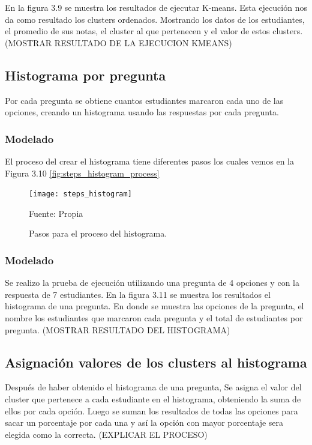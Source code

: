 En la figura 3.9 se muestra los resultados de ejecutar K-means. Esta ejecución nos da como resultado los clusters ordenados. Mostrando los datos de los estudiantes, el promedio de sus notas, el cluster al que pertenecen y el valor de estos clusters.
(MOSTRAR RESULTADO DE LA EJECUCION KMEANS)

\subsection{Histograma por pregunta}

Por cada pregunta se obtiene cuantos estudiantes marcaron cada uno de las opciones, creando un histograma usando las respuestas por cada pregunta.

\subsubsection{Modelado}

El proceso del crear el histograma tiene diferentes pasos los cuales vemos en la Figura 3.10 \ref{fig:steps_histogram_process}

\begin{figure}[ht]
	\begin{center}
		\texttt{[image: steps\_histogram]}
	\end{center}
	\begin{center}
		\vskip -0.5cm
		\caption{\small{Pasos para el proceso del histograma.}}
		{\small{Fuente: Propia}}
	\end{center}
\end{figure}

\subsubsection{Modelado}

Se realizo la prueba de ejecución utilizando una pregunta de 4 opciones y con la respuesta de 7 estudiantes. En la figura 3.11 se muestra los resultados el histograma de una pregunta. En donde se muestra las opciones de la pregunta, el nombre los estudiantes que marcaron cada pregunta y el total de estudiantes por pregunta.
(MOSTRAR RESULTADO DEL HISTOGRAMA)

\subsection{Asignación valores de los clusters al histograma}

Después de haber obtenido el histograma de una pregunta, Se asigna el valor del cluster que pertenece a cada estudiante en el histograma, obteniendo la suma de ellos por cada opción. Luego se suman los resultados de todas las opciones para sacar un porcentaje por cada una y así la opción con mayor porcentaje sera elegida como la correcta. (EXPLICAR EL PROCESO)

